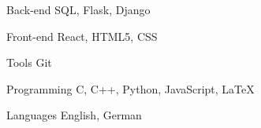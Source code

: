 

\begin{cvskills}
  
  \cvskill
    {Back-end} %
    {SQL, Flask, Django} %
  
  \cvskill
    {Front-end} %
    {React, HTML5, CSS} %
  
  \cvskill
    {Tools} %
    {Git} %

  \cvskill
    {Programming} %
    {C, C++, Python, JavaScript, LaTeX} %

  \cvskill
    {Languages} %
    {English, German} %

\end{cvskills}
